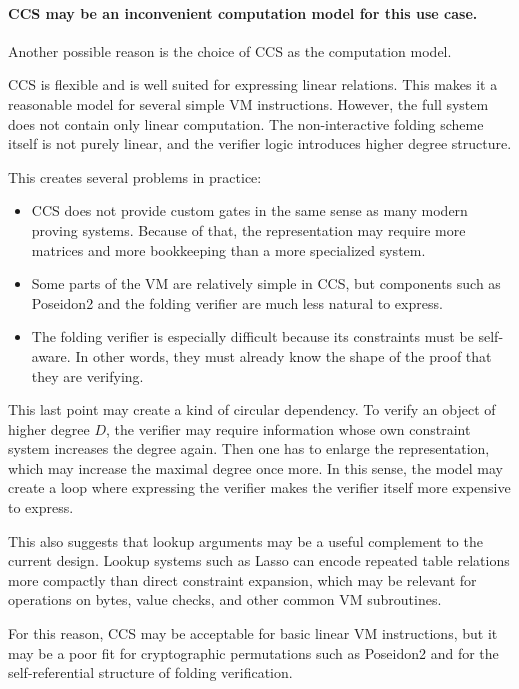 \paragraph{CCS may be an inconvenient computation model for this use case.}

Another possible reason is the choice of CCS as the computation model.

CCS is flexible and is well suited for expressing linear relations. This makes
it a reasonable model for several simple VM instructions. However, the full
system does not contain only linear computation. The non-interactive folding
scheme itself is not purely linear, and the verifier logic introduces higher
degree structure.

This creates several problems in practice:

\begin{itemize}
	\item CCS does not provide custom gates in the same sense as many modern proving
	      systems. Because of that, the representation may require more matrices and
	      more bookkeeping than a more specialized system.
	\item Some parts of the VM are relatively simple in CCS, but components such as
	      Poseidon2 and the folding verifier are much less natural to express.
	\item The folding verifier is especially difficult because its constraints must be
	      self-aware. In other words, they must already know the shape of the proof
	      that they are verifying.
\end{itemize}

This last point may create a kind of circular dependency. To verify an object of
higher degree $D$, the verifier may require information whose own constraint
system increases the degree again. Then one has to enlarge the representation,
which may increase the maximal degree once more. In this sense, the model may
create a loop where expressing the verifier makes the verifier itself more
expensive to express.

This also suggests that lookup arguments may be a useful complement to the
current design. Lookup systems such as Lasso \cite{Lasso} can encode repeated
table relations more compactly than direct constraint expansion, which may
be relevant for operations on bytes, value checks, and other common VM subroutines.

For this reason, CCS may be acceptable for basic linear VM instructions, but it
may be a poor fit for cryptographic permutations such as Poseidon2 and for the
self-referential structure of folding verification.

